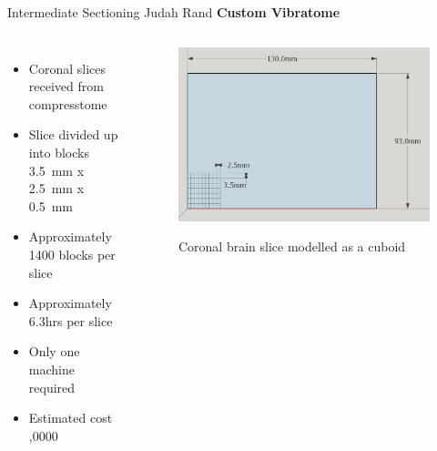 \documentclass[10pt]{beamer}
\begin{document}
\begin{frame}{Intermediate Sectioning\hspace{0pt plus 1 filll} \small{Judah Rand}}
	\textbf{Custom Vibratome}
	\begin{columns}[T,onlytextwidth]
		\vspace{0.5cm}
		\begin{itemize}[label={$\bullet$}]
			\item Coronal slices received from compresstome
			\item Slice divided up into blocks \SI{3.5}{\milli\meter} x \SI{2.5}{\milli\meter} x \SI{0.5}{\milli\meter}
			\item Approximately 1400 blocks per slice
			\item Approximately 6.3hrs per slice
			\vspace{0.8cm}
			\item Only one machine required
			\item Estimated cost ,0000
		\end{itemize}
		\begin{figure}
			\centering
			\includegraphics[width=.5\paperwidth]{brainslice}
			\caption \small Coronal brain slice modelled as a cuboid
		\end{figure}
	\end{columns}
\end{frame}
\end{document}

